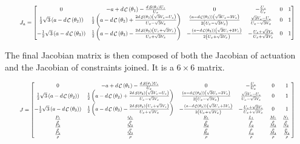 \documentclass[titlepage, letterpaper]{article}
\DeclareMathOperator{\cose}{\mathcal{C}}
\DeclareMathOperator{\sen}{\mathcal{S}}
\begin{document}
\begin{equation}
\label{eq:Ja}
\resizebox{0.94\textwidth}{!}{%
$J_a =
\begin{bmatrix}
 0 & -a+d \cose \left(\theta _1\right)-\frac{d \sen \left(\theta _1\right) U_z}{U_x} & 0 & -\frac{U_z}{U_x} & 0 & 1 \\
 \frac{1}{2} \sqrt{3} \left(a-d \cose \left(\theta _2\right)\right) & \frac{1}{2} \left(a-d \cose \left(\theta _2\right)+\frac{2 d \sen \left(\theta _2\right) \left(\sqrt{3} V_z-U_z\right)}{U_x-\sqrt{3} V_x}\right) & \frac{\left(a-d \cose \left(\theta _2\right)\right) \left(\sqrt{3} U_z-3 V_z\right)}{2 \left(U_x-\sqrt{3} V_x\right)} & \frac{\sqrt{3} V_z-U_z}{U_x-\sqrt{3} V_x} & 0 & 1 \\
 -\frac{1}{2} \sqrt{3} \left(a-d \cose \left(\theta _3\right)\right) & \frac{1}{2} \left(a-d \cose \left(\theta _3\right)-\frac{2 d \sen \left(\theta _3\right) \left(U_z+\sqrt{3} V_z\right)}{U_x+\sqrt{3} V_x}\right) & -\frac{\left(a-d \cose \left(\theta _3\right)\right) \left(\sqrt{3} U_z+3 V_z\right)}{2 \left(U_x+\sqrt{3} V_x\right)} & -\frac{U_z+\sqrt{3} V_z}{U_x+\sqrt{3} V_x} & 0 & 1
\end{bmatrix}$%
}
\end{equation}

The final Jacobian matrix is then composed of both the Jacobian of actuation and  the Jacobian of constraints joined.
It is a $6 \times 6$ matrix.

\begin{equation}
    \label{eq:final_jacobian}
    \resizebox{0.94\textwidth}{!}{%
    $J =
        \begin{bmatrix}
            0 & -a+d \cose \left(\theta _1\right)-\frac{d \sen \left(\theta _1\right) U_z}{U_x} & 0 & -\frac{U_z}{U_x} & 0 & 1 \\
            \frac{1}{2} \sqrt{3} \left(a-d \cose \left(\theta _2\right)\right) & \frac{1}{2} \left(a-d \cose \left(\theta _2\right)+\frac{2 d \sen \left(\theta _2\right) \left(\sqrt{3} V_z-U_z\right)}{U_x-\sqrt{3} V_x}\right) & \frac{\left(a-d \cose \left(\theta _2\right)\right) \left(\sqrt{3} U_z-3 V_z\right)}{2 \left(U_x-\sqrt{3} V_x\right)} & \frac{\sqrt{3} V_z-U_z}{U_x-\sqrt{3} V_x} & 0 & 1 \\
            -\frac{1}{2} \sqrt{3} \left(a-d \cose \left(\theta _3\right)\right) & \frac{1}{2} \left(a-d \cose \left(\theta _3\right)-\frac{2 d \sen \left(\theta _3\right) \left(U_z+\sqrt{3} V_z\right)}{U_x+\sqrt{3} V_x}\right) & -\frac{\left(a-d \cose \left(\theta _3\right)\right) \left(\sqrt{3} U_z+3 V_z\right)}{2 \left(U_x+\sqrt{3} V_x\right)} & -\frac{U_z+\sqrt{3} V_z}{U_x+\sqrt{3} V_x} & 0 & 1 \\
            \frac{P_1}{\rho}& \frac{Q_1}{\rho}& \frac{R_1}{\rho} & \frac{L_1}{\rho}& \frac{M_1}{\rho}& \frac{N_1}{\rho}\ \\
            \frac{P_2}{\rho}& \frac{Q_2}{\rho}& \frac{R_2}{\rho} & \frac{L_2}{\rho}& \frac{M_2}{\rho}& \frac{N_2}{\rho}\ \\
            \frac{P_3}{\rho}& \frac{Q_3}{\rho}& \frac{R_3}{\rho} & \frac{L_3}{\rho}& \frac{M_3}{\rho}& \frac{N_3}{\rho}
    \end{bmatrix}$%
    }
\end{equation}
\end{document}
